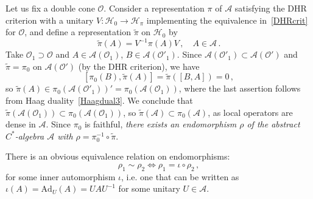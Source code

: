 \documentclass[12pt]{article}
\newcommand{\1}{\mathds{1}}                         %
\newcommand{\Hcal}{\mathcal {H}}
\newcommand{\Ocal}{\mathcal{O}}
\newcommand{\Ac}{{\mathcal{A}}}
\begin{document}
Let us fix a double cone $\Ocal$. Consider a representation $\pi$ of $\Ac$ satisfying the DHR criterion with a unitary $V:\Hcal_0\rightarrow\Hcal_{\pi}$ implementing the equivalence in~\eqref{DHRcrit} for $\Ocal$, and
define a representation $\tilde{\pi}$ on $\Hcal_0$ by
\[
\tilde{\pi}(A)=V^{-1}\pi(A) V\,,\quad A\in\Ac\,.
\]
Take $\Ocal_1\supset \Ocal$ and $A\in\Ac(\Ocal_1)$, $B\in\Ac(\Ocal'_1)$. Since $\Ac(\Ocal'_1)\subset \Ac(\Ocal')$ and $\tilde{\pi}=\pi_0$ on $\Ac(\Ocal')$ (by the DHR criterion), we have
\[
[\pi_0(B),\tilde{\pi}(A)]=\tilde{\pi}([B,A])=0\,,
\]
so $\tilde{\pi}(A)\in \pi_0(\Ac(\Ocal'_1))'=\pi_0(\Ac(\Ocal_1))$, where the last assertion follows from Haag duality~\eqref{Haagdual3}. We conclude that
 $\tilde{\pi}(\Ac(\Ocal_1))\subset \pi_0(\Ac(\Ocal_1))$, so $\tilde{\pi}(\Ac)\subset \pi_0(\Ac)$, as local operators are dense in $\Ac$. Since $\pi_0$ is faithful, \emph{there exists an endomorphism $\rho$ of the abstract $C^*$-algebra $\Ac$ with $\rho=\pi_0^{-1}\circ \tilde{\pi}$}. 

There is an obvious equivalence relation on endomorphisms:
\begin{equation}\label{equiv}
\rho_1\sim\rho_2 \Leftrightarrow \rho_1=\iota\circ\rho_2\,, 
\end{equation}
for some  inner automorphism $\iota$, i.e. one that can be written as $\iota(A)=\mathrm{Ad}_U(A)=UAU^{-1}$ for some unitary $U\in \Ac$. 
\end{document}
